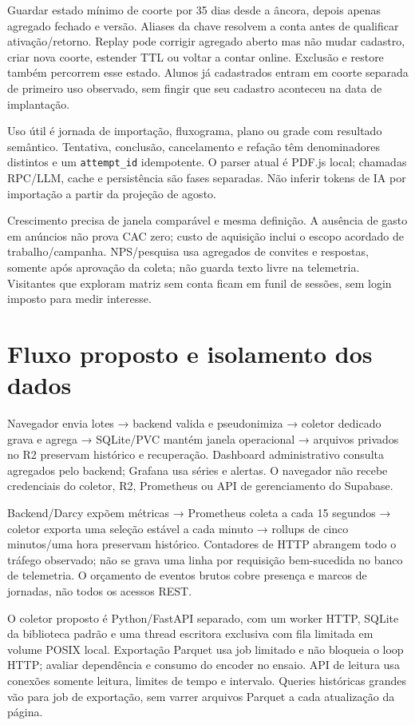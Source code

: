 \documentclass[10pt,a4paper]{article}
\begin{document}
Guardar estado mínimo de coorte por 35 dias desde a âncora, depois
apenas agregado fechado e versão. Aliases da chave resolvem a conta
antes de qualificar ativação/retorno. Replay pode corrigir agregado
aberto mas não mudar cadastro, criar nova coorte, estender TTL ou voltar
a contar online. Exclusão e restore também percorrem esse estado. Alunos
já cadastrados entram em coorte separada de primeiro uso observado, sem
fingir que seu cadastro aconteceu na data de implantação.

Uso útil é jornada de importação, fluxograma, plano ou grade com
resultado semântico. Tentativa, conclusão, cancelamento e refação têm
denominadores distintos e um {\footnotesize\ttfamily\nolinkurl{attempt_id}} idempotente. O parser
atual é PDF.js local; chamadas RPC/LLM, cache e persistência são fases
separadas. Não inferir tokens de IA por importação a partir da projeção
de agosto.

Crescimento precisa de janela comparável e mesma definição. A ausência
de gasto em anúncios não prova CAC zero; custo de aquisição inclui o
escopo acordado de trabalho/campanha. NPS/pesquisa usa agregados de
convites e respostas, somente após aprovação da coleta; não guarda texto
livre na telemetria. Visitantes que exploram matriz sem conta ficam em
funil de sessões, sem login imposto para medir interesse.

\clearpage
\section{Fluxo proposto e isolamento dos
dados}\label{fluxo-proposto-e-isolamento-dos-dados}

Navegador envia lotes → backend valida e pseudonimiza → coletor dedicado
grava e agrega → SQLite/PVC mantém janela operacional → arquivos
privados no R2 preservam histórico e recuperação. Dashboard
administrativo consulta agregados pelo backend; Grafana usa séries e
alertas. O navegador não recebe credenciais do coletor, R2, Prometheus
ou API de gerenciamento do Supabase.

Backend/Darcy expõem métricas → Prometheus coleta a cada 15 segundos →
coletor exporta uma seleção estável a cada minuto → rollups de cinco
minutos/uma hora preservam histórico. Contadores de HTTP abrangem todo o
tráfego observado; não se grava uma linha por requisição bem-sucedida no
banco de telemetria. O orçamento de eventos brutos cobre presença e
marcos de jornadas, não todos os acessos REST.

O coletor proposto é Python/FastAPI separado, com um worker HTTP, SQLite
da biblioteca padrão e uma thread escritora exclusiva com fila limitada
em volume POSIX local. Exportação Parquet usa job limitado e não
bloqueia o loop HTTP; avaliar dependência e consumo do encoder no
ensaio. API de leitura usa conexões somente leitura, limites de tempo e
intervalo. Queries históricas grandes vão para job de exportação, sem
varrer arquivos Parquet a cada atualização da página.
\end{document}
